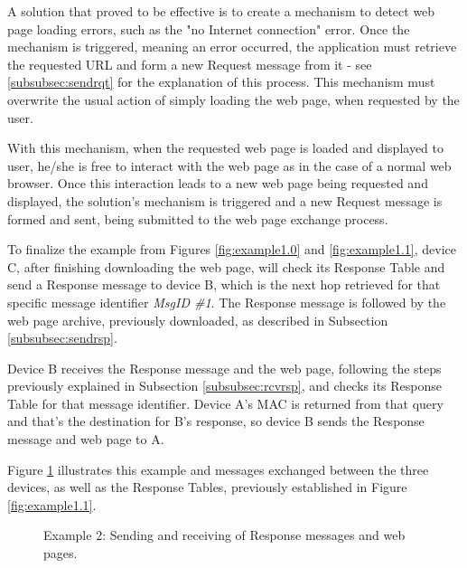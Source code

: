 A solution that proved to be effective is to create a mechanism to detect web page loading errors, such as the "no Internet connection" error. Once the mechanism is triggered, meaning an error occurred, the application must retrieve the requested \gls{URL} and form a new Request message from it - see \ref{subsubsec:sendrqt} for the explanation of this process. This mechanism must overwrite the usual action of simply loading the web page, when requested by the user.

With this mechanism, when the requested web page is loaded and displayed to user, he/she is free to interact with the web page as in the case of a normal web browser. Once this interaction leads to a new web page being requested and displayed, the solution's mechanism is triggered and a new Request message is formed and sent, being submitted to the web page exchange process.

To finalize the example from Figures \ref{fig:example1.0} and \ref{fig:example1.1}, device C, after finishing downloading the web page, will check its Response Table and send a Response message to device B, which is the next hop retrieved for that specific message identifier \textit{MsgID \#1}. The Response message is followed by the web page archive, previously downloaded, as described in Subsection \ref{subsubsec:sendrsp}.

Device B receives the Response message and the web page, following the steps previously explained in Subsection \ref{subsubsec:rcvrsp}, and checks its Response Table for that message identifier. Device A's \gls{MAC} is returned from that query and that's the destination for B's response, so device B sends the Response message and web page to A.

Figure \ref{fig:example1.2} illustrates this example and messages exchanged between the three devices, as well as the Response Tables, previously established in Figure \ref{fig:example1.1}.

\begin{figure}[ht]
   \noindent{}
	\caption{\label{fig:example1.2} Example 2: Sending and receiving of Response messages and web pages.}
\end{figure}

